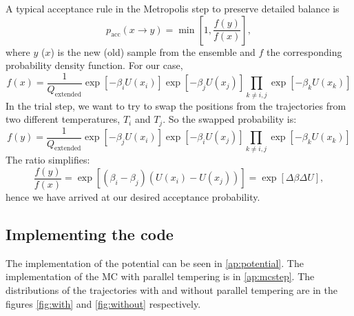 \documentclass[11pt]{article}
\newcommand{\sub}[1]{_{\text{#1}}}
\begin{document}
A typical acceptance rule in the Metropolis step to preserve detailed balance is 
\begin{equation}
	p\sub{acc}(x\rightarrow y) = \min\left[1, \frac{f(y)}{f(x)}\right],
\end{equation}
where $y$ ($x$) is the new (old) sample from the ensemble and $f$ the corresponding probability density function.
For our case, 
\begin{equation}
	f(x) = \frac{1}{Q\sub{extended}}\exp[-\beta_i U(x_i)]\exp[-\beta_j U(x_j)]\prod_{k\neq i,j}\exp[-\beta_k U(x_k)]
\end{equation}
In the trial step, we want to try to swap the positions from the trajectories from two different temperatures, $T_i$ and $T_j$.
So the swapped probability is:
\begin{equation}
	f(y) = \frac{1}{Q\sub{extended}}\exp[-\beta_j U(x_i)]\exp[-\beta_i U(x_j)]\prod_{k\neq i,j}\exp[-\beta_k U(x_k)]
\end{equation}
The ratio simplifies:
\begin{equation}\label{eq:acc}
	\frac{f(y)}{f(x)} = \exp\left[  (\beta_i - \beta_j) (U(x_i) - U(x_j))\right] = \exp[\Delta\beta\Delta U],     
\end{equation}
hence we have arrived at our desired acceptance probability.

\subsection{Implementing the code}

The implementation of the potential can be seen in \autoref{ap:potential}.
The implementation of the MC with parallel tempering is in \autoref{ap:mcstep}.
The distributions of the trajectories with and without parallel tempering are in the figures \ref{fig:with} and \ref{fig:without} respectively.
\end{document}
